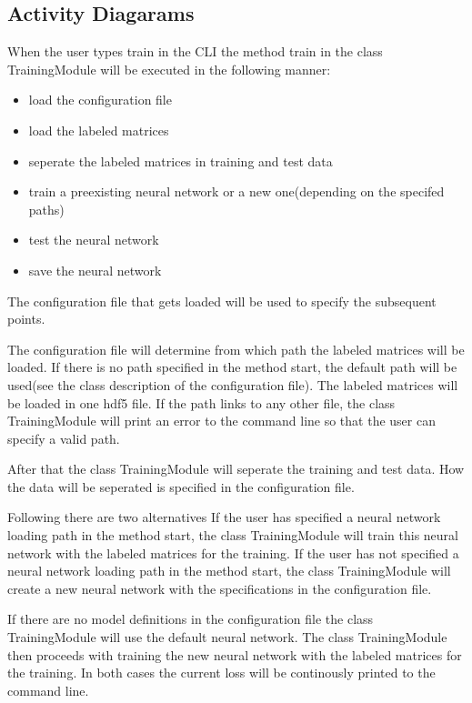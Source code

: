 \documentclass[parskip=full]{scrartcl}
\begin{document}
\subsection{Activity Diagarams}
When the user types train in the CLI the method train in the class TrainingModule will be executed in the following manner:

\begin{itemize}
\item load the configuration file
\item load the labeled matrices
\item seperate the labeled matrices in training and test data
\item train a preexisting neural network or a new one(depending on the specifed paths)
\item test the neural network
\item save the neural network
\end{itemize}

The configuration file that gets loaded will be used to specify the subsequent points.\newline

The configuration file will determine from which path the labeled matrices will be loaded.
If there is no path specified in the method start, the default path will be used(see the class description of the configuration file).
The labeled matrices will be loaded in one hdf5 file. If the path links to any other file, the class TrainingModule will print an error to the command line so that the user can specify a valid path. \newline

After that the class TrainingModule will seperate the training and test data.
How the data will be seperated is specified in the configuration file.\newline

Following there are two alternatives
 If the user has specified a neural network loading path in the method start, the class TrainingModule will train this neural network with the labeled matrices for the training.
If the user has not specified a neural network  loading path in the method start, the class TrainingModule will create a new neural network with the specifications in the configuration file.\newline

If there are no model definitions in the configuration file the class TrainingModule will use the \gls{default neural network}.
The class TrainingModule then proceeds with training the new neural network with the labeled matrices for the training. In both cases the current loss will be continously printed to the command line.\newline
\end{document}
